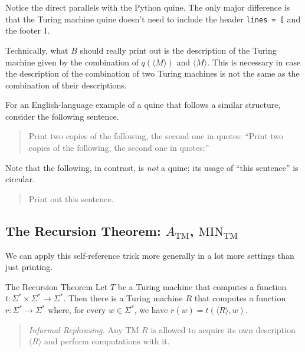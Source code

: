 Notice the direct parallels with the Python quine.
The only major difference is that
the Turing machine quine doesn't need to include
the header \texttt{lines = [} and the footer \texttt{]}.

\begin{remark}
    Technically, what $B$ should really print out is
    the description of the Turing machine given by
    the combination of $q(\langle M \rangle)$ and $\langle M \rangle$.
    This is necessary in case the description of
    the combination of two Turing machines
    is not the same as the combination of their descriptions.
\end{remark}


For an English-language example of a quine
that follows a similar structure, consider the following sentence.
\begin{quote}
    Print two copies of the following,
    the second one in quotes:
    ``Print two copies of the following,
    the second one in quotes:''
\end{quote}
Note that the following, in contrast, is \emph{not} a quine;
its usage of ``this sentence'' is circular.
\begin{quote}
    Print out this sentence.
\end{quote}

\subsection{The Recursion Theorem:
$A_{\mathrm{TM}}$, $\mathrm{MIN}_{\mathrm{TM}}$}

We can apply this self-reference trick
more generally in a lot more settings than just printing.

\begin{theorem}{The Recursion Theorem}
    Let $T$ be a Turing machine
    that computes a function
    $t \colon \Sigma^* \times \Sigma^* \to \Sigma^*$.
    Then there is a Turing machine $R$
    that computes a function $r \colon \Sigma^* \to \Sigma^*$
    where, for every $w \in \Sigma^*$, we have
    $r(w) = t(\langle R \rangle, w)$.
    \begin{quote}
        \emph{Informal Rephrasing.}
        Any TM $R$ is allowed to
        acquire its own description $\langle R \rangle$
        and perform computations with it.
    \end{quote}
\end{theorem}

